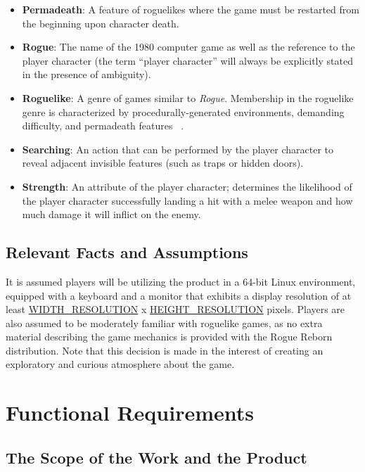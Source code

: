 \documentclass[12pt, titlepage]{article}
\begin{document}
\begin{itemize}
		\item \textbf{Permadeath}: A feature of roguelikes where the game must be restarted from the beginning upon character death.

		\item \textbf{Rogue}: The name of the 1980 computer game as well as the reference to the player character (the term ``player character'' will always be explicitly stated in the presence of ambiguity).

		\item \textbf{Roguelike}: A genre of games similar to \textit{Rogue}. Membership in the roguelike genre is characterized by procedurally-generated environments, demanding difficulty, and permadeath features ~\citep{RoguelikeDefinition}.	

		\item \textbf{Searching}: An action that can be performed by the player character to reveal adjacent invisible features (such as traps or hidden doors).

		\item \textbf{Strength}: An attribute of the player character; determines the likelihood of the player character successfully landing a hit with a melee weapon and how much damage it will inflict on the enemy.
	\end{itemize}

	\subsection{Relevant Facts and Assumptions}

	It is assumed players will be utilizing the product in a 64-bit Linux environment, equipped with a keyboard and a monitor that exhibits a display resolution of at least \hyperref[symbolicParameters]{WIDTH\_RESOLUTION} x \hyperref[symbolicParameters]{HEIGHT\_RESOLUTION} pixels.  Players are also assumed to be moderately familiar with roguelike games, as no extra material describing the game mechanics is provided with the Rogue Reborn distribution.  Note that this decision is made in the interest of creating an exploratory and curious atmosphere about the game. 

\newpage

\section{Functional Requirements}

	\subsection{The Scope of the Work and the Product}
\end{document}
